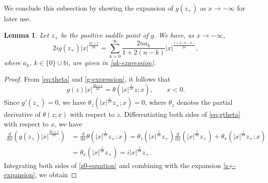 \documentclass[11pt,a4paper]{article}
\newtheorem{lemma}[thm]{Lemma}
\numberwithin{equation}{section}
\begin{document}
We conclude this subsection by showing the expansion of $g(z_+)$ as $x\to -\infty$ for later use.
\begin{lemma}\label{eq:gz}
Let $z_+$ be the positive saddle point of $g$. We have, as $x\to -\infty$,
\begin{equation}\label{eq:gexpansion}
2ig(z_+)|x|^{\frac{2n+1}{2n}}=\sum_{k=0}^{\infty}\frac{2na_k}{1+2(n-k)}
|x|^{\frac{1+2(n-k)}{2n}},
\end{equation}
where $a_k$, $k\in \{0\}\cup\mathbb{N}$, are given in \eqref{ak-expression}.
\end{lemma}
\begin{proof}
From \eqref{eq:theta} and \eqref{g-expression}, it follows that
\begin{equation}\label{eq:gtheta}
g(z)|x|^{\frac{2n+1}{2n}}=\theta\left(|x|^{\frac{1}{2n}}z;x\right), \qquad x<0.
\end{equation}
Since $g'(z_+)=0$, we have $\theta_z\left(|x|^{\frac{1}{2n}}z_+;x\right)=0$, where $\theta_z$ denotes the partial derivative of $\theta(z;x)$ with respect to $z$.
Differentiating both sides of \eqref{eq:gtheta} with respect to $x$, we have
\begin{align} \nonumber
\frac{\mathrm{d}}{\mathrm{d}x} \left(g(z_+)|x|^{\frac{2n+1}{2n}}\right)
&=\frac{\mathrm{d}}{\mathrm{d}x}\theta\left(|x|^{\frac{1}{2n}}z_+ ;x\right)
=\theta_z\left(|x|^{\frac{1}{2n}}z_+\right)\frac{\mathrm{d}}{\mathrm{d}x}
\left(|x|^{\frac{1}{2n}}z_+ \right)+\theta_x\left(|x|^{\frac{1}{2n}}z_+;x \right)\nonumber \\
&=\theta_x\left(|x|^{\frac{1}{2n}}z_+\right) \label{z0-equation}
=i|x|^{\frac{1}{2n}}z_+.\end{align}
Integrating both sides of \eqref{z0-equation} and combining with the expansion \eqref{z+-expansion}, we obtain

\end{proof}
\end{document}
